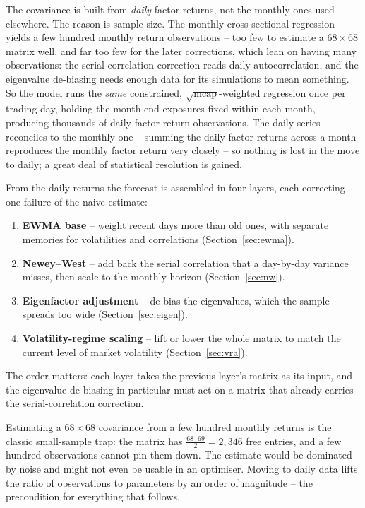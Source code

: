 \documentclass[11pt]{article}
\theoremstyle{definition}
\theoremstyle{plain}
\theoremstyle{remark}
\begin{document}
The covariance is built from \emph{daily} factor returns, not the monthly ones used elsewhere. The reason is sample size. The monthly cross-sectional regression yields a few hundred monthly return observations -- too few to estimate a $68\times68$ matrix well, and far too few for the later corrections, which lean on having many observations: the serial-correlation correction reads daily autocorrelation, and the eigenvalue de-biasing needs enough data for its simulations to mean something. So the model runs the \emph{same} constrained, $\sqrt{\text{mcap}}$-weighted regression once per trading day, holding the month-end exposures fixed within each month, producing thousands of daily factor-return observations. The daily series reconciles to the monthly one -- summing the daily factor returns across a month reproduces the monthly factor return very closely -- so nothing is lost in the move to daily; a great deal of statistical resolution is gained.

From the daily returns the forecast is assembled in four layers, each correcting one failure of the naive estimate:
\begin{enumerate}[leftmargin=1.6em,topsep=2pt]
  \item \textbf{EWMA base} -- weight recent days more than old ones, with separate memories for volatilities and correlations (Section~\ref{sec:ewma}).
  \item \textbf{Newey--West} -- add back the serial correlation that a day-by-day variance misses, then scale to the monthly horizon (Section~\ref{sec:nw}).
  \item \textbf{Eigenfactor adjustment} -- de-bias the eigenvalues, which the sample spreads too wide (Section~\ref{sec:eigen}).
  \item \textbf{Volatility-regime scaling} -- lift or lower the whole matrix to match the current level of market volatility (Section~\ref{sec:vra}).
\end{enumerate}
The order matters: each layer takes the previous layer's matrix as its input, and the eigenvalue de-biasing in particular must act on a matrix that already carries the serial-correlation correction.

\begin{pitfall}
Estimating a $68\times68$ covariance from a few hundred monthly returns is the classic small-sample trap: the matrix has $\tfrac{68\cdot 69}{2}=2{,}346$ free entries, and a few hundred observations cannot pin them down. The estimate would be dominated by noise and might not even be usable in an optimiser. Moving to daily data lifts the ratio of observations to parameters by an order of magnitude -- the precondition for everything that follows.
\end{pitfall}
\end{document}
